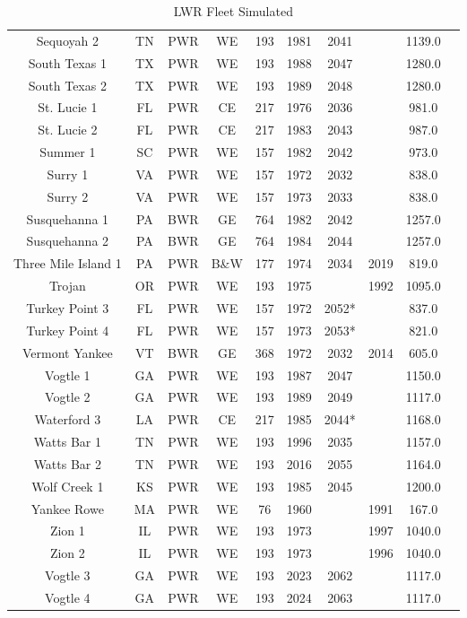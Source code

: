 \begin{table}[h!]
\begin{tabular}{c c c c c c c c c c}
    Sequoyah 2 & TN & PWR & WE & 193 & 1981 & 2041 &  & 1139.0 \\
    South Texas 1 & TX & PWR & WE & 193 & 1988 & 2047 &  & 1280.0 \\
    South Texas 2 & TX & PWR & WE & 193 & 1989 & 2048 &  & 1280.0 \\
    St. Lucie 1 & FL & PWR & CE & 217 & 1976 & 2036 &  & 981.0 \\
    St. Lucie 2 & FL & PWR & CE & 217 & 1983 & 2043 &  & 987.0 \\
    Summer 1 & SC & PWR & WE & 157 & 1982 & 2042 &  & 973.0 \\
    Surry 1 & VA & PWR & WE & 157 & 1972 & 2032 &  & 838.0 \\
    Surry 2 & VA & PWR & WE & 157 & 1973 & 2033 &  & 838.0 \\
    Susquehanna 1 & PA & BWR & GE & 764 & 1982 & 2042 &  & 1257.0 \\
    Susquehanna 2 & PA & BWR & GE & 764 & 1984 & 2044 &  & 1257.0 \\
    Three Mile Island 1 & PA & PWR & B\&W & 177 & 1974 & 2034 & 2019 & 819.0 \\
    Trojan & OR & PWR & WE & 193 & 1975 &  & 1992 & 1095.0 \\
    Turkey Point 3 & FL & PWR & WE & 157 & 1972 & 2052* &  & 837.0 \\
    Turkey Point 4 & FL & PWR & WE & 157 & 1973 & 2053* &  & 821.0 \\
    Vermont Yankee & VT & BWR & GE & 368 & 1972 & 2032 & 2014 & 605.0 \\
    Vogtle 1 & GA & PWR & WE & 193 & 1987 & 2047 &  & 1150.0 \\
    Vogtle 2 & GA & PWR & WE & 193 & 1989 & 2049 &  & 1117.0 \\
    Waterford 3 & LA & PWR & CE & 217 & 1985 & 2044* &  & 1168.0 \\
    Watts Bar 1 & TN & PWR & WE & 193 & 1996 & 2035 &  & 1157.0 \\
    Watts Bar 2 & TN & PWR & WE & 193 & 2016 & 2055 &  & 1164.0 \\
    Wolf Creek 1 & KS & PWR & WE & 193 & 1985 & 2045 &  & 1200.0 \\
    Yankee Rowe & MA & PWR & WE & 76 & 1960 &  & 1991 & 167.0 \\
    Zion 1 & IL & PWR & WE & 193 & 1973 &  & 1997 & 1040.0 \\
    Zion 2 & IL & PWR & WE & 193 & 1973 &  & 1996 & 1040.0 \\
    Vogtle 3 & GA & PWR & WE & 193 & 2023 & 2062 &  & 1117.0 \\
    Vogtle 4 & GA & PWR & WE & 193 & 2024 & 2063 &  & 1117.0 \\
    \hline
    \end{tabular}
    \caption{LWR Fleet Simulated}
    \label{tab:lwr_fleet}
\end{table}


